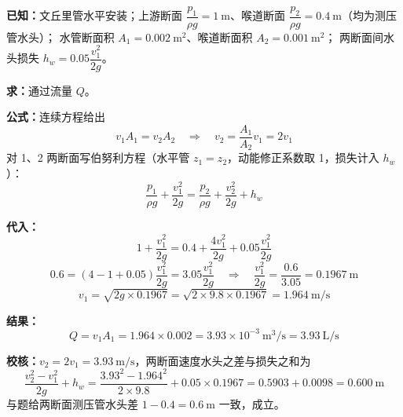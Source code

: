 
\begin{jie}
\textbf{已知：}文丘里管水平安装；上游断面 $\dfrac{p_1}{\rho g}=1\ \mathrm{m}$、喉道断面 $\dfrac{p_2}{\rho g}=0.4\ \mathrm{m}$（均为测压管水头）；
水管断面积 $A_1=0.002\ \mathrm{m^2}$、喉道断面积 $A_2=0.001\ \mathrm{m^2}$；
两断面间水头损失 $h_w=0.05\dfrac{v_1^{2}}{2g}$。

\textbf{求：}通过流量 $Q$。

\textbf{公式：}连续方程给出
\[
v_1A_1=v_2A_2\quad\Longrightarrow\quad v_2=\frac{A_1}{A_2}v_1=2v_1
\]
对 1、2 两断面写伯努利方程（水平管 $z_1=z_2$，动能修正系数取 1，损失计入 $h_w$）：
\[
\frac{p_1}{\rho g}+\frac{v_1^{2}}{2g}=\frac{p_2}{\rho g}+\frac{v_2^{2}}{2g}+h_w
\]

\textbf{代入：}
\[
1+\frac{v_1^{2}}{2g}=0.4+\frac{4v_1^{2}}{2g}+0.05\frac{v_1^{2}}{2g}
\]
\[
0.6=\left(4-1+0.05\right)\frac{v_1^{2}}{2g}=3.05\frac{v_1^{2}}{2g}
\quad\Longrightarrow\quad
\frac{v_1^{2}}{2g}=\frac{0.6}{3.05}=0.1967\ \mathrm{m}
\]
\[
v_1=\sqrt{2g\times0.1967}=\sqrt{2\times9.8\times0.1967}=1.964\ \mathrm{m/s}
\]

\textbf{结果：}
\[
Q=v_1A_1=1.964\times0.002=3.93\times10^{-3}\ \mathrm{m^3/s}=3.93\ \mathrm{L/s}
\]

\textbf{校核：}$v_2=2v_1=3.93\ \mathrm{m/s}$，两断面速度水头之差与损失之和为
\[
\frac{v_2^{2}-v_1^{2}}{2g}+h_w=\frac{3.93^{2}-1.964^{2}}{2\times9.8}+0.05\times0.1967
=0.5903+0.0098=0.600\ \mathrm{m}
\]
与题给两断面测压管水头差 $1-0.4=0.6\ \mathrm{m}$ 一致，成立。
\end{jie}


